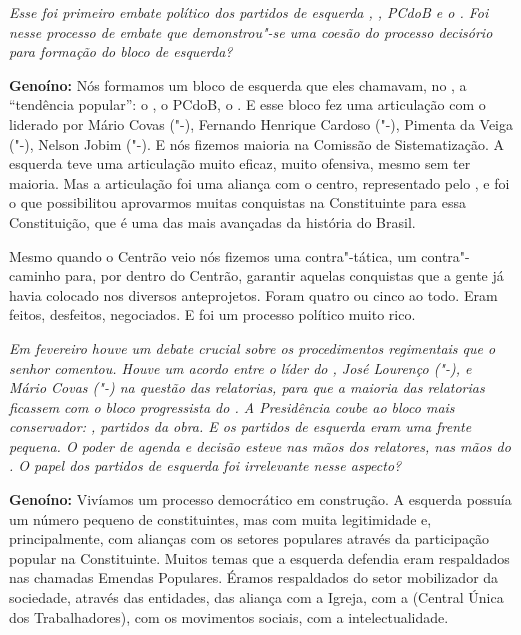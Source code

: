 \emph{Esse foi primeiro embate político dos partidos de esquerda ,
, PCdoB e o . Foi nesse processo de embate que demonstrou"-se uma
coesão do processo decisório para formação do bloco de esquerda?}

\textbf{Genoíno:} Nós formamos um bloco de esquerda que eles chamavam,
no , a ``tendência popular'': o , o PCdoB, o . E esse bloco fez
uma articulação com o  liderado por Mário Covas ("-), Fernando
Henrique Cardoso ("-), Pimenta da Veiga ("-), Nelson Jobim
("-). E nós fizemos maioria na Comissão de Sistematização. A
esquerda teve uma articulação muito eficaz, muito ofensiva, mesmo sem
ter maioria. Mas a articulação foi uma aliança com o centro,
representado pelo , e foi o que possibilitou aprovarmos muitas
conquistas na Constituinte para essa Constituição, que é uma das mais
avançadas da história do Brasil.

Mesmo quando o Centrão veio nós fizemos uma contra"-tática, um
contra"-caminho para, por dentro do Centrão, garantir aquelas conquistas
que a gente já havia colocado nos diversos anteprojetos. Foram quatro ou
cinco ao todo. Eram feitos, desfeitos, negociados. E foi um processo
político muito rico.

\emph{Em fevereiro houve um debate crucial sobre os procedimentos
regimentais que o senhor comentou. Houve um acordo entre o líder do ,
José Lourenço ("-), e Mário Covas ("-) na questão das
relatorias, para que a maioria das relatorias ficassem com o bloco
progressista do . A Presidência coube ao bloco mais conservador:
, partidos da obra. E os partidos de esquerda eram uma frente
pequena. O poder de agenda e decisão esteve nas mãos dos relatores, nas
mãos do . O papel dos partidos de esquerda foi irrelevante nesse
aspecto?}

\textbf{Genoíno:} Vivíamos um processo democrático em construção. A
esquerda possuía um número pequeno de constituintes, mas com muita
legitimidade e, principalmente, com alianças com os setores populares
através da participação popular na Constituinte. Muitos temas que a
esquerda defendia eram respaldados nas chamadas Emendas Populares.
Éramos respaldados do setor mobilizador da sociedade, através das
entidades, das aliança com a Igreja, com a  (Central Única dos
Trabalhadores), com os movimentos sociais, com a intelectualidade.

